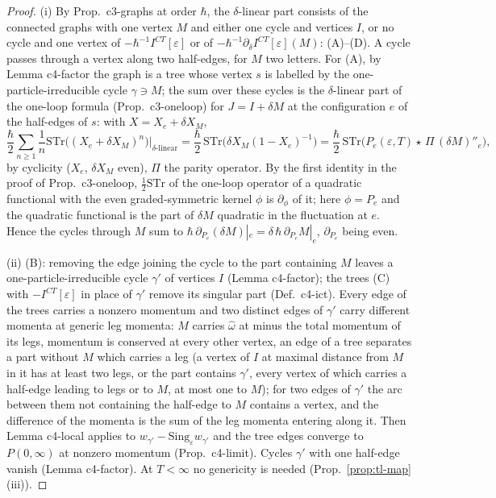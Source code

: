 \documentclass[11pt]{article}
\numberwithin{equation}{section}
\theoremstyle{plain}
\theoremstyle{definition}
\begin{document}
\begin{proof}
(i) By Prop.~c3-graphs at order $\hbar$, the $\delta$-linear part consists of the connected graphs with one vertex $M$ and either one cycle and vertices $I$, or no cycle and one vertex of $-\hbar^{-1}I^{CT}[\varepsilon]$ or of $-\hbar^{-1}\partial_\delta I^{CT}[\varepsilon](M)$: (A)--(D). A cycle passes through a vertex along two half-edges, for $M$ two letters. For (A), by Lemma c4-factor the graph is a tree whose vertex $s$ is labelled by the one-particle-irreducible cycle $\gamma\ni M$; the sum over these cycles is the $\delta$-linear part of the one-loop formula (Prop.~c3-oneloop) for $J=I+\delta M$ at the configuration $e$ of the half-edges of $s$: with $X=X_e+\delta X_M$,
\[
\frac\hbar2\sum_{n\ge1}\frac1n\mathrm{STr}\big((X_e+\delta X_M)^n\big)\Big|_{\delta\text{-linear}}=\frac\hbar2\,\mathrm{STr}\big(\delta X_M(1-X_e)^{-1}\big)=\frac\hbar2\,\mathrm{STr}\big(P_e(\varepsilon,T)\star\,\Pi\,(\delta M)''_e\big),
\]
by cyclicity ($X_e$, $\delta X_M$ even), $\Pi$ the parity operator. By the first identity in the proof of Prop.~c3-oneloop, $\tfrac12\mathrm{STr}$ of the one-loop operator of a quadratic functional with the even graded-symmetric kernel $\phi$ is $\partial_\phi$ of it; here $\phi=P_e$ and the quadratic functional is the part of $\delta M$ quadratic in the fluctuation at $e$. Hence the cycles through $M$ sum to $\hbar\,\partial_{P_e}(\delta M)|_e=\delta\,\hbar\,\partial_{P_e}M|_e$, $\partial_{P_e}$ being even.

(ii) (B): removing the edge joining the cycle to the part containing $M$ leaves a one-particle-irreducible cycle $\gamma'$ of vertices $I$ (Lemma c4-factor); the trees (C) with $-I^{CT}[\varepsilon]$ in place of $\gamma'$ remove its singular part (Def.~c4-ict). Every edge of the trees carries a nonzero momentum and two distinct edges of $\gamma'$ carry different momenta at generic leg momenta: $M$ carries $\hat\omega$ at minus the total momentum of its legs, momentum is conserved at every other vertex, an edge of a tree separates a part without $M$ which carries a leg (a vertex of $I$ at maximal distance from $M$ in it has at least two legs, or the part contains $\gamma'$, every vertex of which carries a half-edge leading to legs or to $M$, at most one to $M$); for two edges of $\gamma'$ the arc between them not containing the half-edge to $M$ contains a vertex, and the difference of the momenta is the sum of the leg momenta entering along it. Then Lemma c4-local applies to $w_{\gamma'}-\mathrm{Sing}_\varepsilon w_{\gamma'}$ and the tree edges converge to $P(0,\infty)$ at nonzero momentum (Prop.~c4-limit). Cycles $\gamma'$ with one half-edge vanish (Lemma c4-factor). At $T<\infty$ no genericity is needed (Prop.~\ref{prop:tl-map} (iii)).


\end{proof}
\end{document}
